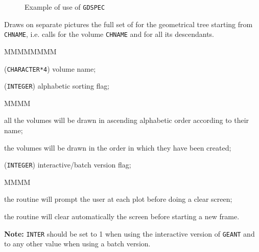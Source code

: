 \begin{figure}[hbt]
     \centering
     \caption{Example of use of {\tt GDSPEC}}
     \label{fg:draw220-2}
\end{figure}

Draws on separate pictures the full set of  for the geometrical
tree starting from {\tt CHNAME}, i.e. calls  for
the volume {\tt CHNAME} and for all its descendants.
\begin{DLtt}{MMMMMMMM}
\item[CHNAME] ({\tt CHARACTER*4}) volume name;
\item[ISORT] ({\tt INTEGER}) alphabetic sorting flag;
\begin{DLtt}{MMMM}
\item[$= 1$] all the volumes will be drawn in ascending alphabetic order
according to their name;
\item[$\neq 1$] the volumes will be drawn in the order in which they
have been created;
\end{DLtt}
\item[INTER] ({\tt INTEGER}) interactive/batch version flag;
\begin{DLtt}{MMMM}
\item[$= 1$] the routine will prompt the user at each plot
before doing a clear screen;
\item[$\neq 0$] the routine will clear automatically the screen 
before starting a new frame.
\end{DLtt}

{\bf Note:} {\tt INTER} should be set to 1 when using the interactive version 
of {\tt GEANT} and to any other value when using a batch version.
\end{DLtt}
